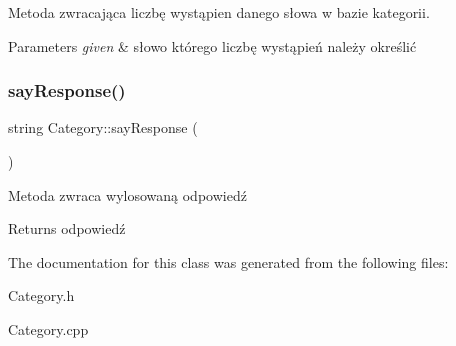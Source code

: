 Metoda zwracająca liczbę wystąpien danego słowa w bazie kategorii. 


\begin{DoxyParams}{Parameters}
{\em given} & słowo którego liczbę wystąpień należy określić \\
\hline
\end{DoxyParams}
\mbox{\label{class_category_ac2902099aab40f2f7a0283eb955981ac}} 
\subsubsection{\texorpdfstring{sayResponse()}{sayResponse()}}
{\footnotesize\ttfamily string Category\+::say\+Response (\begin{DoxyParamCaption}{ }\end{DoxyParamCaption})}



Metoda zwraca wylosowaną odpowiedź 

\begin{DoxyReturn}{Returns}
odpowiedź 
\end{DoxyReturn}


The documentation for this class was generated from the following files\+:\begin{DoxyCompactItemize}
\item 
Category.\+h\item 
Category.\+cpp\end{DoxyCompactItemize}
